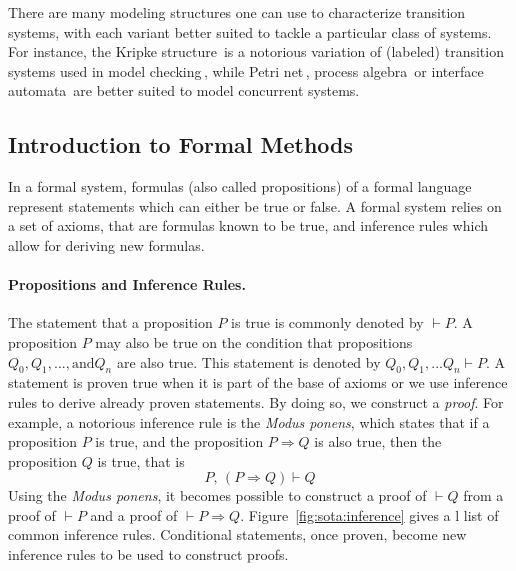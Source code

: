 There are many modeling structures one can use to characterize transition
systems, with each variant better suited to tackle a particular class of
systems.
%
For instance, the Kripke structure\,\cite{kripke1971semantical} is a notorious
variation of (labeled) transition systems used in model
checking\,\cite{clarke1999model}, while Petri net\,\cite{peterson1981petri},
process algebra\,\cite{bergstra1984process} or interface
automata\,\cite{de2001interface} are better suited to model concurrent systems.

\subsection{Introduction to Formal Methods}
\label{subsec:sota:fm}

In a formal system, formulas (also called
propositions) of a formal language represent statements which can either be true
or false.
%
A formal system relies on a set of axioms, that are formulas known to be true,
and inference rules which allow for deriving new formulas.

\paragraph{Propositions and Inference Rules.}
%
The statement that a proposition \( P \) is true is commonly denoted by
\( \vdash P \).
%
A proposition \( P \) may also be true on the condition that propositions
\( Q_0, Q_1, ..., \text{and} Q_n \) are also true.
%
This statement is denoted by \( Q_0, Q_1, ... Q_n \vdash P \).
%
A statement is proven true when it is part of the base of axioms or we use
inference rules to derive already proven statements.
%
By doing so, we construct a \emph{proof}.
%
For example, a notorious inference rule is the \emph{Modus ponens}, which states
that if a proposition \( P \) is true, and the proposition \( P \Rightarrow Q \)
is also true, then the proposition \( Q \) is true, that is
%
\[
  P\text{, }(P \Rightarrow Q) \vdash Q
\]
%
Using the \emph{Modus ponens}, it becomes possible to construct a proof of
\( \vdash Q \) from a proof of \( \vdash P \) and a proof of
\( \vdash P \Rightarrow Q \).
%
Figure~\ref{fig:sota:inference} gives a l list of common inference rules.
%
Conditional statements, once proven, become new inference rules to be used to
construct proofs.

